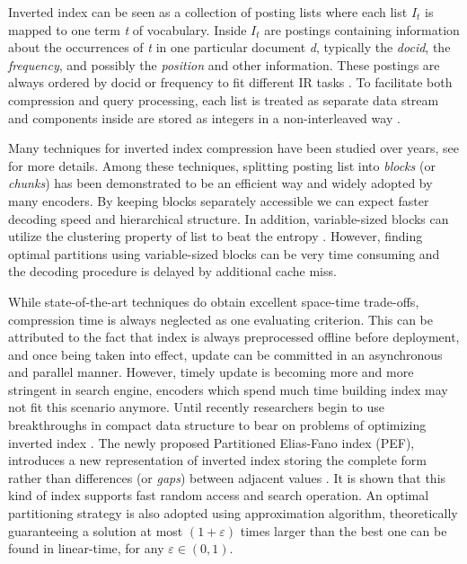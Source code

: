 \documentclass[runningheads]{comsis2}
\begin{document}
Inverted index can be seen as a collection of posting lists where each list $I_t$ is mapped to one term \textit{t} of vocabulary.
Inside $I_t$ are postings containing information about the occurrences of \textit{t} in one particular document \textit{d}, typically the \textit{docid}, the \textit{frequency}, and possibly the \textit{position} and other information.
These postings are always ordered by docid or frequency to fit different IR tasks \cite{navarro2010dual}.
To facilitate both compression and query processing, each list is treated as separate data stream and components inside are stored as integers in a non-interleaved way \cite{anh2010index}.

Many techniques for inverted index compression have been studied over years, see \cite{catena2014inverted,trotman2014compression} for more details.
Among these techniques, splitting posting list into \textit{blocks} (or \textit{chunks}) has been demonstrated to be an efficient way and widely adopted by many encoders.
By keeping blocks separately accessible we can expect faster decoding speed and hierarchical structure.
In addition, variable-sized blocks can utilize the clustering property of list to beat the entropy \cite{silvestri2010vsencoding,moffat2000binary}.
However, finding optimal partitions using variable-sized blocks can be very time consuming and the decoding procedure is delayed by additional cache miss.

While state-of-the-art techniques do obtain excellent space-time trade-offs, compression time is always neglected as one evaluating criterion.
This can be attributed to the fact that index is always preprocessed offline before deployment, and once being taken into effect, update can be committed in an asynchronous and parallel manner.
However, timely update is becoming more and more stringent in search engine, encoders which spend much time building index may not fit this scenario anymore.
Until recently researchers begin to use breakthroughs in compact data structure to bear on problems of optimizing inverted index \cite{navarro2010dual,petri2014score}.
The newly proposed Partitioned Elias-Fano index (PEF), introduces a new representation of inverted index storing the complete form rather than differences (or \textit{gaps}) between adjacent values \cite{ottaviano2014partitioned,vigna2013quasi}.
It is shown that this kind of index supports fast random access and search operation.
An optimal partitioning strategy is also adopted using approximation algorithm, theoretically guaranteeing a solution at most $\left(1+\varepsilon\right)$ times larger than the best one can be found in linear-time, for any $ \varepsilon \in \left(0, 1\right) $.
\end{document}
